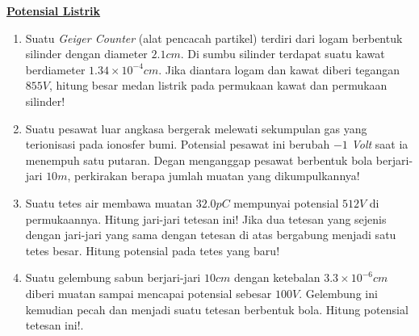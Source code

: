 \noindent\underline{\textbf{Potensial Listrik}}
\begin{enumerate}
    \item Suatu \textit{Geiger Counter} (alat pencacah partikel) terdiri dari logam berbentuk silinder dengan diameter $2.1cm$. Di sumbu silinder terdapat suatu kawat berdiameter $1.34\times10^{-4}cm$. Jika diantara logam dan kawat diberi tegangan $855V$, hitung besar medan listrik pada permukaan kawat dan permukaan silinder!

    \item Suatu pesawat luar angkasa bergerak melewati sekumpulan gas yang terionisasi pada ionosfer bumi. Potensial pesawat ini berubah $-1$ \textit{Volt} saat ia menempuh satu putaran. Degan menganggap pesawat berbentuk bola berjari-jari $10m$, perkirakan berapa jumlah muatan yang dikumpulkannya!

    \item Suatu tetes air membawa muatan $32.0pC$ mempunyai potensial $512V$ di permukaannya. Hitung jari-jari tetesan ini! Jika dua tetesan yang sejenis dengan jari-jari yang sama dengan tetesan di atas bergabung menjadi satu tetes besar. Hitung potensial pada tetes yang baru!

    \item Suatu gelembung sabun berjari-jari $10cm$ dengan ketebalan $3.3\times 10^{-6}cm$ diberi muatan sampai mencapai potensial sebesar $100V$. Gelembung ini kemudian pecah dan menjadi suatu tetesan berbentuk bola. Hitung potensial tetesan ini!.
\end{enumerate}

